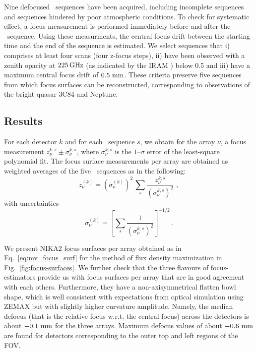 Nine defocused \bm\ sequences have been acquired, including incomplete
sequences and sequences hindered by poor atmospheric conditions. To
check for systematic effect, a focus measurement is performed
immediately before and after the \bm\ sequence. Using these
measurments, the central focus drift between the starting time and the
end of the sequence is estimated. 
We select sequences that i) comprises at least four scans (four
z-focus steps), ii) have been observed with a zenith opacity at $225\,\rm{GHz}$ (as indicated by
the IRAM \taumeter) below 0.5 and iii) have a maximum central focus
drift of $0.5~\rm{mm}$. These criteria preserve five sequences from which focus
surfaces can be reconstructed, %
corresponding to observations of the bright quasar 3C84 and Neptune.

\subsection{Results}
For each detector $k$ and for each \bm\ sequence $s$, we obtain for
the array $\nu$, a focus measurement $z_\nu^{k, s} \pm \sigma_\nu^{k, s}$,
where $\sigma_\nu^{k, s}$ is the $1\mbox{--}\sigma$ error of the least-square
polynomial fit. The focus surface measurements per array are obtained
as weighted averages of the five \bm\ sequences as in the
following:
%
\begin{equation}
\label{eq:mv_focus_surf}
z_\nu^{(k)} = \left( \sigma_\nu^{(k)} \right)^2 \,  \sum_s \frac{z_\nu^{k,s}}{\left(\sigma_\nu^{k,s}\right)^2}\, \,  ,
\end{equation}
with uncertainties 
\begin{equation}
\label{eq:error_mv_focus_surf}
\sigma_\nu^{(k)} = \left[ \sum_s \frac{1}{\left(\sigma_\nu^{k,s}\right)^2}\right]^{-1/2}\, .
\end{equation}


We present NIKA2 focus surfaces per array obtained as in
Eq.~\ref{eq:mv_focus_surf} for the method of flux density maximization  
in Fig.~\ref{fig:focus-surfaces}.
We further check that the three flavours of focus-estimators provide
us with focus surfaces per array that are in good agreement with each
others. Furthermore, they have a non-axisymmetrical flatten bowl
shape, which is well consistent with expectations from optical
simulation using ZEMAX but with slightly higher curvature amplitude.
Namely, the median defocus (that is the relative focus w.r.t. the
central focus) across the detectors is about
$-0.1~\rm{mm}$ for the three arrays. Maximum defocus values of about
$-0.6~\rm{mm}$ are found for detectors corresponding to the outer top and
left regions of the FOV.

